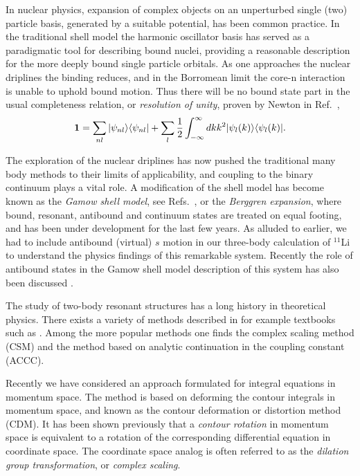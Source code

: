 In nuclear physics, expansion of complex objects on an unperturbed
single (two) particle basis, generated by a suitable potential,
has been common practice. In the traditional shell model the
harmonic oscillator basis has served as a paradigmatic tool for
describing bound nuclei, providing a reasonable description for
the more deeply bound single particle orbitals. As one approaches
the nuclear driplines the binding reduces, and in the Borromean
limit the core-n interaction is unable to uphold bound motion.
Thus there will be no bound state part in the usual completeness
relation, or \emph{resolution of unity}, proven by Newton in
Ref.~\cite{newton},
\begin{equation}
\label{eq:unity1} {\bf 1} = \sum_{nl}
\vert\psi_{nl}\rangle\langle\psi_{nl}\vert + \sum_{l}{1\over
2}\int_{-\infty}^{\infty} dk
k^2\vert\psi_{l}(k)\rangle\langle\psi_{l}(k)\vert.
\end{equation}

The exploration of the nuclear driplines has now pushed the
traditional many body methods to their limits of applicability,
and coupling to the binary continuum  plays a vital
role. A modification of the shell model has become known as the
\emph{Gamow shell model}, see Refs.~\cite{witek1,betan}, or the {\it
Berggren expansion}, where bound, resonant, antibound and continuum
states are treated on equal footing, and has been under
development for
the last few years. As alluded to earlier, we had to include
antibound (virtual) $s$ motion in our three-body calculation of
$^{11}$Li to understand the physics findings of this remarkable
system. Recently the role of antibound states in the Gamow shell
model description of this system has also been discussed \cite{betan}.

The study of two-body resonant structures has a long history in
theoretical physics. There exists a variety of methods described
in for example textbooks such as \cite{newton}. Among the more
popular methods one finds the complex scaling method (CSM) and the
method based on analytic continuation in the coupling constant
(ACCC).

Recently we have considered an approach formulated for integral
equations in momentum space.  The method is based on deforming the
contour integrals in momentum space, and known as the contour
deformation or distortion method (CDM). It has been shown
previously that a \emph{contour rotation} in momentum space is
equivalent to a rotation of the corresponding differential
equation in coordinate space. The coordinate space analog is often
referred to as the \emph{dilation group transformation}, or
\emph{complex scaling}.

